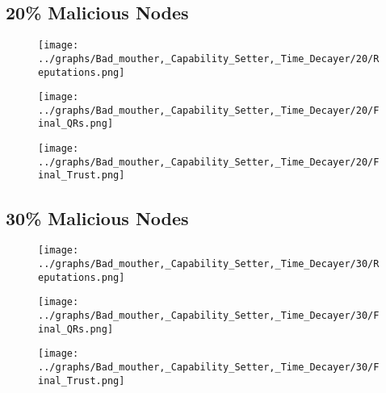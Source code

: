 \documentclass{article}
\begin{document}
  \begin{minipage}[t]{0.49\columnwidth}
    \subsection*{20\% Malicious Nodes}
        \begin{figure}[H]
            \centering
            \texttt{[image: ../graphs/Bad\_mouther,\_Capability\_Setter,\_Time\_Decayer/20/Reputations.png]}
        \end{figure}
        \begin{figure}[H]
            \centering
            \texttt{[image: ../graphs/Bad\_mouther,\_Capability\_Setter,\_Time\_Decayer/20/Final\_QRs.png]}
        \end{figure}
    \end{minipage}
    \begin{minipage}[t]{0.49\columnwidth}
        \begin{figure}[H]
            \centering
            \texttt{[image: ../graphs/Bad\_mouther,\_Capability\_Setter,\_Time\_Decayer/20/Final\_Trust.png]}
        \end{figure}
    \end{minipage}

  \begin{minipage}[t]{0.49\columnwidth}
    \subsection*{30\% Malicious Nodes}
        \begin{figure}[H]
            \centering
            \texttt{[image: ../graphs/Bad\_mouther,\_Capability\_Setter,\_Time\_Decayer/30/Reputations.png]}
        \end{figure}
        \begin{figure}[H]
            \centering
            \texttt{[image: ../graphs/Bad\_mouther,\_Capability\_Setter,\_Time\_Decayer/30/Final\_QRs.png]}
        \end{figure}
    \end{minipage}
    \begin{minipage}[t]{0.49\columnwidth}
        \begin{figure}[H]
            \centering
            \texttt{[image: ../graphs/Bad\_mouther,\_Capability\_Setter,\_Time\_Decayer/30/Final\_Trust.png]}
        \end{figure}
    \end{minipage}
\end{document}
